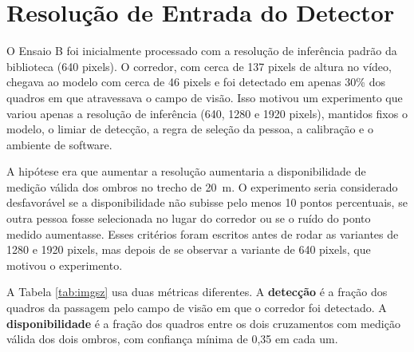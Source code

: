 \documentclass[
    12pt,               %
    openright,          %
    twoside,            %
    a4paper,            %
    chapter=TITLE,      %
    english,            %
    brazil              %
    ]{abntex2}
\begin{document}
\section{Resolução de Entrada do Detector}
\label{sec:resultado_imgsz}

O Ensaio B foi inicialmente processado com a resolução de inferência padrão da biblioteca (640 pixels). O corredor, com cerca de 137 pixels de altura no vídeo, chegava ao modelo com cerca de 46 pixels e foi detectado em apenas 30\% dos quadros em que atravessava o campo de visão. Isso motivou um experimento que variou apenas a resolução de inferência (640, 1280 e 1920 pixels), mantidos fixos o modelo, o limiar de detecção, a regra de seleção da pessoa, a calibração e o ambiente de software.

A hipótese era que aumentar a resolução aumentaria a disponibilidade de medição válida dos ombros no trecho de 20~m. O experimento seria considerado desfavorável se a disponibilidade não subisse pelo menos 10 pontos percentuais, se outra pessoa fosse selecionada no lugar do corredor ou se o ruído do ponto medido aumentasse. Esses critérios foram escritos antes de rodar as variantes de 1280 e 1920 pixels, mas depois de se observar a variante de 640 pixels, que motivou o experimento.

A Tabela \ref{tab:imgsz} usa duas métricas diferentes. A \textbf{detecção} é a fração dos quadros da passagem pelo campo de visão em que o corredor foi detectado. A \textbf{disponibilidade} é a fração dos quadros entre os dois cruzamentos com medição válida dos dois ombros, com confiança mínima de 0,35 em cada um.
\end{document}
